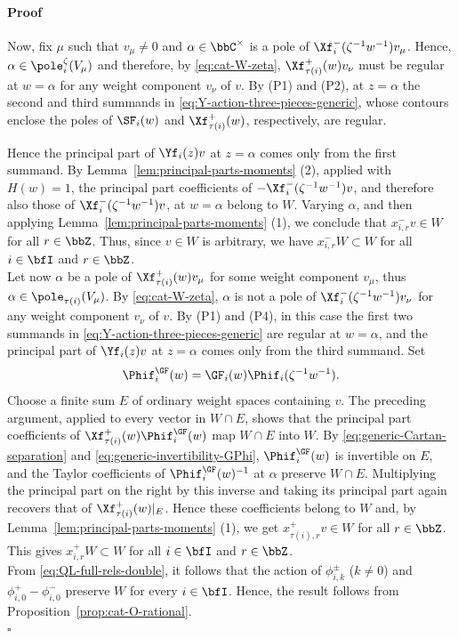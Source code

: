 \documentclass[reqno]{amsart}
\numberwithin{equation}{section}
\newenvironment{pf}{\medskip\paragraph{{\sc Proof}}}{\hfill$\square$\par\medskip}
\begin{document}
\begin{pf}
Now, fix $\mu$ such that $v_{\mu}\neq0$ and $\alpha\in\bbC^\times$ is a pole of
$\Xf_i^-(\zeta^{-1}w^{-1})v_{\mu}$.  Hence, $\alpha\in\pole_i^\zeta(V_\mu)$ and therefore, 
by \eqref{eq:cat-W-zeta}, $\Xf_{\tau(i)}^+(w)v_\nu$ must be regular at $w=\alpha$
	for any weight component $v_\nu$ of $v$. By (P1) and (P2), at
	$z=\alpha$ the second and third summands in
	\eqref{eq:Y-action-three-pieces-generic}, whose contours enclose the poles of $\SF_i(w)$
	and $\Xf_{\tau(i)}^+(w)$, respectively, are regular.

Hence the principal part of $\Yf_i(z)v$ at $z=\alpha$ comes only from the first summand.
By Lemma~\ref{lem:principal-parts-moments} (2), applied with $H(w)=1$, the
	principal part coefficients of $-\Xf_i^-(\zeta^{-1}w^{-1})v$,
	and therefore also those of $\Xf_i^-(\zeta^{-1}w^{-1})v$,
at $w=\alpha$ belong to $W$. Varying $\alpha$, and then applying
Lemma~\ref{lem:principal-parts-moments} (1), we conclude that 
$x_{i,r}^-v\in W$ for all $r\in\bbZ$. Thus, since $v\in W$ is arbitrary,
we have $x_{i,r}^-W\subset W$ for all $i\in\bfI$ and $r\in\bbZ$.\\

	Let now $\alpha$ be a pole of $\Xf_{\tau(i)}^+(w)v_\mu$ 
	for some weight component $v_\mu$, thus $\alpha\in\pole_{\tau(i)}(V_\mu)$. 
By \eqref{eq:cat-W-zeta}, $\alpha$ is not a pole of
$\Xf_i^-(\zeta^{-1}w^{-1})v_\nu$
	for any weight component $v_\nu$ of $v$. By (P1) and (P4), in this case
	the first two summands in
\eqref{eq:Y-action-three-pieces-generic} are regular at $w=\alpha$, and
the principal part of $\Yf_i(z)v$ at $z=\alpha$ comes only from the third summand.
Set
\[
\Phif^{\GF}_i(w)=\GF_i(w)\Phif_i(\zeta^{-1}w^{-1}).
\]
Choose a finite sum $E$ of ordinary weight spaces containing $v$. 
The preceding argument, applied to every
vector in $W\cap E$, shows that the principal part coefficients of
$\Xf_{\tau(i)}^+(w)\Phif^{\GF}_i(w)$ map $W\cap E$ into $W$.
By \eqref{eq:generic-Cartan-separation} and
\eqref{eq:generic-invertibility-GPhi}, $\Phif^{\GF}_i(w)$ is invertible on $E$,
and the Taylor coefficients of $\Phif^{\GF}_i(w)^{-1}$ at $\alpha$ preserve $W\cap E$.
Multiplying the principal part on the right by this inverse and
taking its principal part again recovers that of
$\Xf_{\tau(i)}^+(w)|_E$.
Hence these coefficients belong to $W$ and, by
Lemma~\ref{lem:principal-parts-moments} (1), we get
$x_{\tau(i),r}^+v\in W$ for all $r\in\bbZ$. This gives $x_{i,r}^+W\subset W$ for all $i\in\bfI$ and $r\in\bbZ$.\\

From \eqref{eq:QL-full-rels-double}, it follows that the action of $\phi^{\pm}_{i,k}$ ($k\neq0$) and $\phi^+_{i,0}-\phi^-_{i,0}$ preserve $W$ for every $i\in\bfI$. 
Hence, the result follows from Proposition~\ref{prop:cat-O-rational}.\\


\end{pf}
\end{document}
